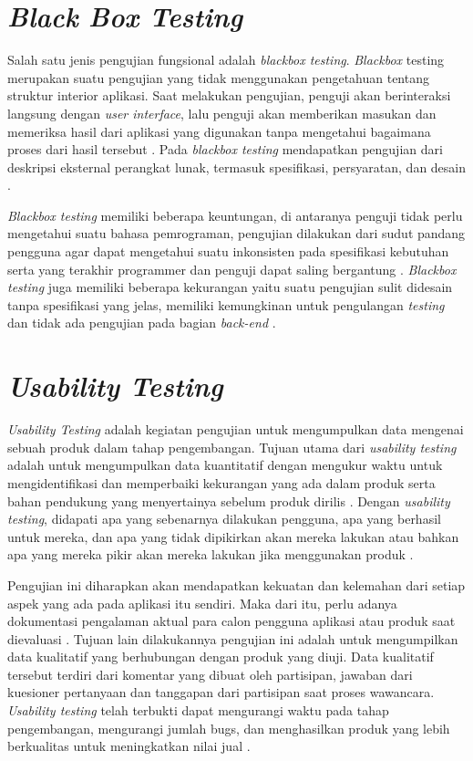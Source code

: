 \section{\textit{Black Box Testing}}
Salah satu jenis pengujian fungsional adalah \textit{blackbox testing}. \textit{Blackbox} testing merupakan suatu pengujian yang tidak menggunakan pengetahuan tentang struktur interior aplikasi. Saat melakukan pengujian, penguji akan berinteraksi langsung dengan \textit{user interface}, lalu penguji akan memberikan masukan dan memeriksa hasil dari aplikasi yang digunakan tanpa mengetahui bagaimana proses dari hasil tersebut \citep{xu2016comparative}. Pada \textit{blackbox testing} mendapatkan pengujian dari deskripsi eksternal perangkat lunak, termasuk spesifikasi, persyaratan, dan desain \citep{ammann2016introduction}.

\par \textit{Blackbox testing} memiliki beberapa keuntungan, di antaranya penguji tidak perlu mengetahui suatu bahasa pemrograman, pengujian dilakukan dari sudut pandang pengguna agar dapat mengetahui suatu inkonsisten pada spesifikasi kebutuhan serta yang terakhir programmer dan penguji dapat saling bergantung \citep{jaya2018pengujian}. \textit{Blackbox testing} juga memiliki beberapa kekurangan yaitu suatu pengujian sulit didesain tanpa spesifikasi yang jelas, memiliki kemungkinan untuk pengulangan \textit{testing} dan tidak ada pengujian pada bagian \textit{back-end} \citep{jaya2018pengujian}.

\section{\textit{Usability Testing}}
\textit{Usability Testing} adalah kegiatan pengujian untuk mengumpulkan data mengenai sebuah produk dalam tahap pengembangan. Tujuan utama dari \textit{usability testing} adalah untuk mengumpulkan data kuantitatif dengan mengukur waktu untuk mengidentifikasi dan memperbaiki kekurangan yang ada dalam produk serta bahan pendukung yang menyertainya sebelum produk dirilis \citep{rubin2008handbook}. Dengan \textit{usability testing}, didapati apa yang sebenarnya dilakukan pengguna, apa yang berhasil untuk mereka, dan apa yang tidak dipikirkan akan mereka lakukan atau bahkan apa yang mereka pikir akan mereka lakukan jika menggunakan produk \citep{barnum2020usability}.


\par Pengujian ini diharapkan akan mendapatkan kekuatan dan kelemahan dari setiap aspek yang ada pada aplikasi itu sendiri. Maka dari itu, perlu adanya dokumentasi pengalaman aktual para calon pengguna aplikasi atau produk saat dievaluasi \citep{wesfix2017branding}. Tujuan lain dilakukannya pengujian ini adalah untuk mengumpilkan data kualitatif yang berhubungan dengan produk yang diuji. Data kualitatif tersebut terdiri dari komentar yang dibuat oleh partisipan, jawaban dari kuesioner pertanyaan dan tanggapan dari partisipan saat proses wawancara. \textit{Usability testing} telah terbukti dapat mengurangi waktu pada tahap pengembangan, mengurangi jumlah bugs, dan menghasilkan produk yang lebih berkualitas untuk meningkatkan nilai jual \citep{wahl2000student}.

